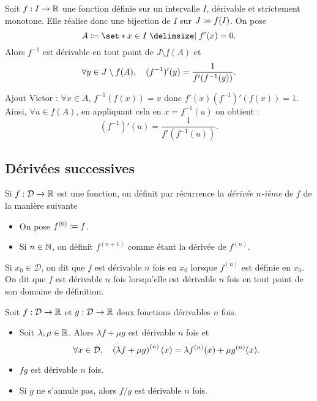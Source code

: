 \documentclass{magnolia}
\begin{document}
\begin{proposition}
Soit $f:I\to\mathbb{R}$ une fonction définie sur un intervalle $I$, dérivable et strictement monotone.
Elle réalise donc une bijection de $I$ sur $J\coloneqq f(I)$. On pose
\[A\defeq\enstq{x\in I}{f'(x)= 0}.\]
Alors $f^{-1}$ est dérivable en tout point de $J\setminus f(A)$ et
\[\forall y\in J\setminus f(A),\quad (f^{-1})'(y)=\frac{1}{f'(f^{-1}(y))}.\]
\end{proposition}
\begin{sol}
Ajout Victor : $\forall x \in A$, $f^{-1}(f(x))=x$ donc $f'(x)(f^{-1})'(f(x))=1$. Ainsi, $\forall u \in f(A)$, en appliquant cela en $x=f^{-1}(u)$ on obtient :
\[(f^{-1})'(u)=\frac{1}{f'(f^{-1}(u))}.\]
\end{sol}

\subsection{Dérivées successives}


\begin{definition}[utile=-3]
Si $f:\mathcal{D}\to\mathbb{R}$ est une fonction, on définit par récurrence
la \emph{dérivée $n$-ième} de $f$ de la manière suivante
\begin{itemize}
\item On pose $f^{(0)}\coloneqq f$.
\item Si $n\in\mathbb{N}$, on définit $f^{(n+1)}$ comme étant la dérivée de $f^{(n)}$.
\end{itemize}
Si $x_0\in\mathcal{D}$, on dit que $f$ est dérivable $n$ fois en $x_0$
lorsque $f^{(n)}$ est définie en $x_0$. On dit que $f$ est dérivable $n$ fois lorsqu'elle
est dérivable $n$ fois en tout point de son domaine de définition.
\end{definition}
 
\begin{proposition}[utile=-3]
Soit $f:\mathcal{D}\to\mathbb{R}$ et $g:\mathcal{D}\to\mathbb{R}$ deux fonctions dérivables $n$ fois.
\begin{itemize}
\item Soit $\lambda,\mu\in\mathbb{R}$. Alors $\lambda f+\mu g$ est dérivable $n$
  fois et
  \[\forall x\in\mathcal{D} ,\quad
    \left(\lambda f+\mu g\right)^{(n)}(x)=\lambda f^{(n)}(x)+\mu g^{(n)}(x).\]
\item $fg$ est dérivable $n$ fois.
\item Si $g$ ne s'annule pas, alors $f/g$ est dérivable $n$ fois.
\end{itemize}
\end{proposition}
\end{document}
